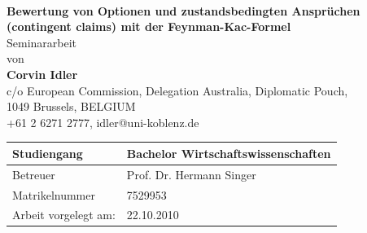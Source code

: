 \begin{titlepage}
\thispagestyle{empty}
 \begin{center}
 \begin{figure}[htbp]
    \centering
    \hspace{7.5em}
     \\
 \centering
  \vspace*{1.0cm}
\end{figure}

   



  \vspace*{2.5cm}
 {\bf \Large Bewertung von Optionen und zustandsbedingten Anspr{\"u}chen (contingent claims) mit der Feynman-Kac-Formel}
 \vspace*{3.5cm} \\
 {\Large Seminararbeit\\von\\}
 \vspace{0.5cm}
 {\large \bfseries Corvin Idler\\}
c/o European Commission, Delegation Australia, Diplomatic Pouch, \\1049 Brussels, BELGIUM\\
 +61 2 6271 2777, idler@uni-koblenz.de
 \vfill



\begin{table}[h]
	\centering
	\begin{tabular}{|l| l|}\hline
		Studiengang & Bachelor Wirtschaftswissenschaften\\ \hline
		Betreuer & Prof. Dr. Hermann Singer\\ \hline
		Matrikelnummer & 7529953\\ \hline
		Arbeit vorgelegt am: & 22.10.2010\\ \hline
	\end{tabular}
\end{table}

 \end{center}
\end{titlepage}